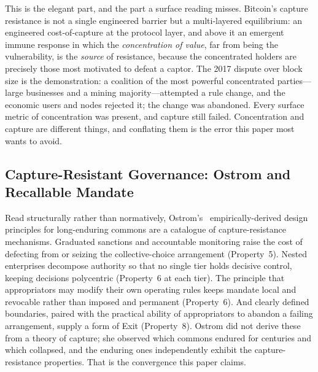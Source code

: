 \documentclass[11pt]{article}
\theoremstyle{definition}
\theoremstyle{plain}
\begin{document}
This is the elegant part, and the part a surface reading misses. Bitcoin's capture
resistance is not a single engineered barrier but a multi-layered equilibrium: an
engineered cost-of-capture at the protocol layer, and above it an emergent immune
response in which the \emph{concentration of value}, far from being the vulnerability,
is the \emph{source} of resistance, because the concentrated holders are precisely
those most motivated to defeat a captor. The 2017 dispute over block size is the
demonstration: a coalition of the most powerful concentrated parties---large
businesses and a mining majority---attempted a rule change, and the economic users
and nodes rejected it; the change was abandoned. Every surface metric of
concentration was present, and capture still failed. Concentration and capture are
different things, and conflating them is the error this paper most wants to avoid.

\subsection{Capture-Resistant Governance: Ostrom and Recallable Mandate}

Read structurally rather than normatively, Ostrom's~\cite{ostrom1990}
empirically-derived design principles for long-enduring commons are a catalogue of
capture-resistance mechanisms. Graduated sanctions and accountable monitoring raise
the cost of defecting from or seizing the collective-choice arrangement
(Property~5). Nested enterprises decompose authority so that no single tier holds
decisive control, keeping decisions polycentric (Property~6 at each tier). The
principle that appropriators may modify their own operating rules keeps mandate
local and revocable rather than imposed and permanent (Property~6). And clearly
defined boundaries, paired with the practical ability of appropriators to abandon a
failing arrangement, supply a form of Exit (Property~8). Ostrom did not derive these
from a theory of capture; she observed which commons endured for centuries and which
collapsed, and the enduring ones independently exhibit the capture-resistance
properties. That is the convergence this paper claims.
\end{document}
